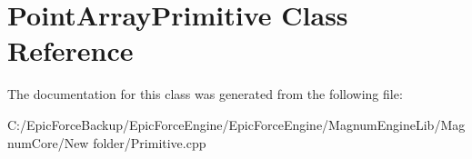 \hypertarget{class_point_array_primitive}{}\section{Point\+Array\+Primitive Class Reference}
\label{class_point_array_primitive}


The documentation for this class was generated from the following file\+:\begin{DoxyCompactItemize}
\item 
C\+:/\+Epic\+Force\+Backup/\+Epic\+Force\+Engine/\+Epic\+Force\+Engine/\+Magnum\+Engine\+Lib/\+Magnum\+Core/\+New folder/Primitive.\+cpp\end{DoxyCompactItemize}
